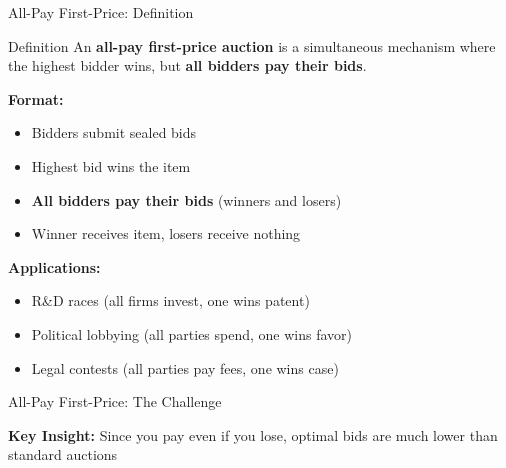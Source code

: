 \documentclass[xcolor={x11names}, aspectratio=169 ]{beamer}
\begin{document}
\begin{frame}{All-Pay First-Price: Definition}
\begin{block}{Definition}
An \textbf{all-pay first-price auction} is a simultaneous mechanism where the highest bidder wins, but \textbf{all bidders pay their bids}.
\end{block}

\textbf{Format:}
\begin{itemize}
\item Bidders submit sealed bids
\item Highest bid wins the item
\item \textbf{All bidders pay their bids} (winners and losers)
\item Winner receives item, losers receive nothing
\end{itemize}

\textbf{Applications:}
\begin{itemize}
  \item R\&D races (all firms invest, one wins patent)
  \item Political lobbying (all parties spend, one wins favor)
  \item Legal contests (all parties pay fees, one wins case)
\end{itemize}
\end{frame}

\begin{frame}{All-Pay First-Price: The Challenge}
\begin{center}
\end{center}

\textbf{Key Insight:} Since you pay even if you lose, optimal bids are much lower than standard auctions
\end{frame}
\end{document}
